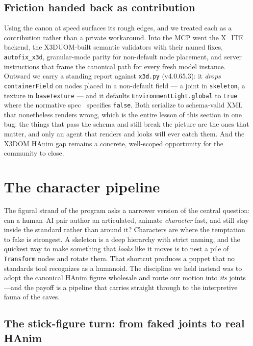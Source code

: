 \documentclass[11pt]{article}
\newcommand{\xite}{X\_ITE}
\begin{document}
\subsection{Friction handed back as contribution}

Using the canon at speed surfaces its rough edges, and we treated each as a contribution rather than a private workaround. Into the MCP went the \xite{} backend, the X3DUOM-built semantic validators with their named fixes, \texttt{autofix\_x3d}, granular-mode parity for non-default node placement, and server instructions that frame the canonical path for every fresh model instance. Outward we carry a standing report against \texttt{x3d.py} (v4.0.65.3): it \emph{drops} \texttt{containerField} on nodes placed in a non-default field --- a joint in \texttt{skeleton}, a texture in \texttt{baseTexture} --- and it defaults \texttt{EnvironmentLight.global} to \texttt{true} where the normative spec~\cite{x3d4} specifies \texttt{false}. Both serialize to schema-valid XML that nonetheless renders wrong, which is the entire lesson of this section in one bug: the things that pass the schema and still break the picture are the ones that matter, and only an agent that renders and looks will ever catch them. And the X3DOM HAnim gap remains a concrete, well-scoped opportunity for the community to close.

\section{The character pipeline}\label{sec:characters}

The figural strand of the program asks a narrower version of the central question: can a human--AI pair author an articulated, animate \emph{character} fast, and still stay inside the standard rather than around it? Characters are where the temptation to fake is strongest. A skeleton is a deep hierarchy with strict naming, and the quickest way to make something that \emph{looks} like it moves is to nest a pile of \texttt{Transform} nodes and rotate them. That shortcut produces a puppet that no standards tool recognizes as a humanoid. The discipline we held instead was to adopt the canonical HAnim figure wholesale and route our motion into \emph{its} joints---and the payoff is a pipeline that carries straight through to the interpretive fauna of the caves.

\subsection{The stick-figure turn: from faked joints to real HAnim}
\end{document}
